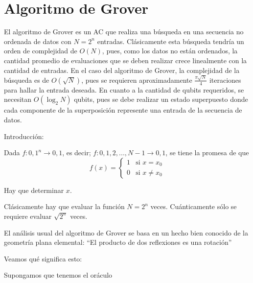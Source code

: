\chapter{Algoritmo de Grover}

El algoritmo de Grover es un AC que realiza una búsqueda en una secuencia no ordenada de datos con $N=2^n$ entradas. Clásicamente esta búsqueda tendría un orden de complejidad de $O(N)$, pues, como los datos no están ordenados, la cantidad promedio de evaluaciones que se deben realizar crece linealmente con la cantidad de entradas. En el caso del algoritmo de Grover, la complejidad de la búsqueda es de $O(\sqrt{N})$, pues se requieren aproximadamente $\frac{\pi\sqrt{N}}{4}$ iteraciones para hallar la entrada deseada. En cuanto a la cantidad de qubits requeridos, se necesitan $O(\log_2 N)$ qubits, pues se debe realizar un estado superpuesto donde cada componente de la superposición represente una entrada de la secuencia de datos.

Introducción:

Dada $f:{0,1}^n \rightarrow {0,1}$, es decir; $f:{0,1,2,...,N-1} \rightarrow
{0,1}$, se tiene la promesa de que 
\[
  f(x) = 
\begin{cases}
1 & \text{si } x = x_0 \\
0 & \text{si } x \neq x_0
\end{cases}
\]

Hay que determinar $x$.

Clásicamente hay que evaluar la función $N=2^n$ veces. Cuánticamente sólo se
requiere evaluar $\sqrt{2^n}$ veces.

El análisis usual del algoritmo de Grover se basa en un hecho bien conocido de
la geometría plana elemental: ``El producto de dos reflexiones es una rotación''

Veamos qué significa esto:

Supongamos que tenemos el oráculo

